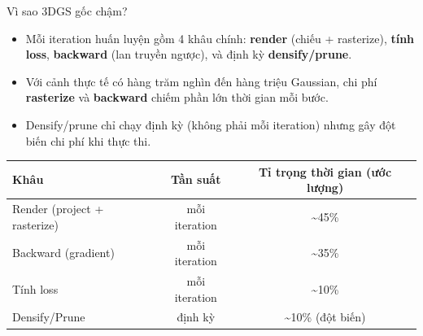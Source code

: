 
\begin{frame}{Vì sao 3DGS gốc chậm?}
\begin{itemize}
    \item Mỗi iteration huấn luyện gồm 4 khâu chính: \textbf{render} (chiếu + rasterize), \textbf{tính loss}, \textbf{backward} (lan truyền ngược), và định kỳ \textbf{densify/prune}.
    \item Với cảnh thực tế có hàng trăm nghìn đến hàng triệu Gaussian, chi phí \textbf{rasterize} và \textbf{backward} chiếm phần lớn thời gian mỗi bước.
    \item Densify/prune chỉ chạy định kỳ (không phải mỗi iteration) nhưng gây đột biến chi phí khi thực thi.
\end{itemize}
\vspace{0.3cm}
\centering
\footnotesize
\begin{tabular}{lcc}
\toprule
\textbf{Khâu} & \textbf{Tần suất} & \textbf{Tỉ trọng thời gian (ước lượng)} \\
\midrule
Render (project + rasterize) & mỗi iteration & \textasciitilde 45\% \\
Backward (gradient) & mỗi iteration & \textasciitilde 35\% \\
Tính loss & mỗi iteration & \textasciitilde 10\% \\
Densify/Prune & định kỳ & \textasciitilde 10\% (đột biến) \\
\bottomrule
\end{tabular}
\end{frame}


